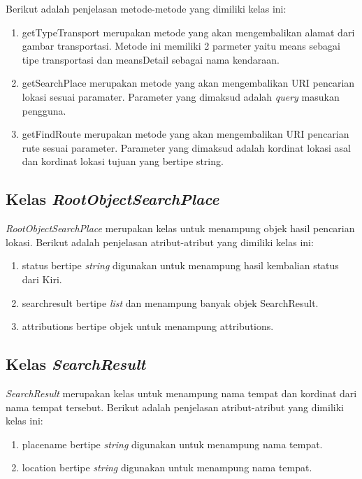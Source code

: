 Berikut adalah penjelasan metode-metode yang dimiliki kelas ini:
\begin{enumerate}
	\item getTypeTransport merupakan metode yang akan mengembalikan alamat dari gambar transportasi. Metode ini memiliki 2 parmeter yaitu means sebagai tipe transportasi dan meansDetail sebagai nama kendaraan.
	\item getSearchPlace merupakan metode yang akan mengembalikan URI pencarian lokasi sesuai paramater. Parameter yang dimaksud adalah \textit{query} masukan pengguna.
	\item getFindRoute merupakan metode yang akan mengembalikan URI pencarian rute sesuai parameter. Parameter yang dimaksud adalah kordinat lokasi asal dan kordinat lokasi tujuan yang bertipe string.
\end{enumerate}

\subsection{Kelas \textit{RootObjectSearchPlace}}
\label{lab:Kelas RootObjectSearchPlace}
\hspace{0.5cm} \textit{RootObjectSearchPlace} merupakan kelas untuk menampung objek hasil pencarian lokasi. Berikut adalah penjelasan atribut-atribut yang dimiliki kelas ini:
\begin{enumerate}
	\item status bertipe \textit{string} digunakan untuk menampung hasil kembalian status dari Kiri.
	\item searchresult bertipe \textit{list} dan menampung banyak objek SearchResult. 
	\item attributions bertipe objek untuk menampung attributions.
\end{enumerate}


\subsection{Kelas \textit{SearchResult}}
\label{lab:Kelas SearchResult}
\hspace{0.5cm} \textit{SearchResult} merupakan kelas untuk menampung nama tempat dan kordinat dari nama tempat tersebut. Berikut adalah penjelasan atribut-atribut yang dimiliki kelas ini:
\begin{enumerate}
	\item placename bertipe \textit{string} digunakan untuk menampung nama tempat. 
	\item location bertipe \textit{string} digunakan untuk menampung nama tempat.
\end{enumerate}

